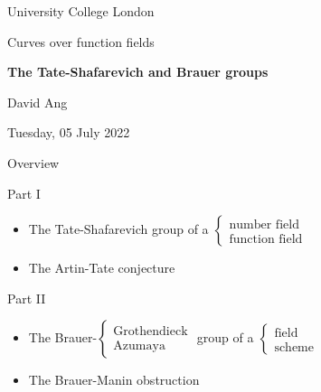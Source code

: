 \documentclass[10pt]{beamer}
\begin{document}
\begin{frame}

\begin{center}

{\scriptsize University College London}

\vspace{0.5cm}

{\small Curves over function fields}

\vspace{1cm}

\textbf{\large The Tate-Shafarevich and Brauer groups}

\vspace{1cm}

David Ang

\vspace{0.5cm}

{\footnotesize Tuesday, 05 July 2022}

\end{center}

\end{frame}

\begin{frame}{Overview}

Part I
\begin{itemize}
\item The Tate-Shafarevich group of a $ \begin{cases} \text{number field} \\ \text{function field} \end{cases} $
\item The Artin-Tate conjecture
\end{itemize}

\vspace{0.5cm}

{ Part II
\begin{itemize}
\item The Brauer-$ \begin{cases} \text{Grothendieck} \\ \text{Azumaya} \end{cases} $ group of a $ \begin{cases} \text{field} \\ \text{scheme} \end{cases} $
\item The Brauer-Manin obstruction
\end{itemize}
}

\end{frame}
\end{document}
